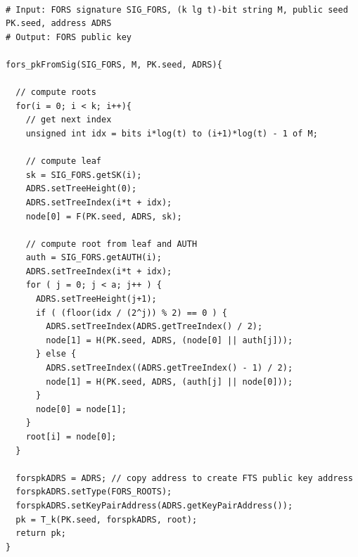 \begin{lstlisting}[breaklines=true, label=alg:fors:rootFromSig, language=pseudoc,
                   caption=\forspkfromsig\ --
                   Compute a \fors public key from a \fors signature.]

# Input: FORS signature SIG_FORS, (k lg t)-bit string M, public seed PK.seed, address ADRS
# Output: FORS public key

fors_pkFromSig(SIG_FORS, M, PK.seed, ADRS){

  // compute roots
  for(i = 0; i < k; i++){
    // get next index
    unsigned int idx = bits i*log(t) to (i+1)*log(t) - 1 of M;

    // compute leaf
    sk = SIG_FORS.getSK(i);
    ADRS.setTreeHeight(0);
    ADRS.setTreeIndex(i*t + idx);
    node[0] = F(PK.seed, ADRS, sk);

    // compute root from leaf and AUTH
    auth = SIG_FORS.getAUTH(i);
    ADRS.setTreeIndex(i*t + idx);
    for ( j = 0; j < a; j++ ) {
      ADRS.setTreeHeight(j+1);
      if ( (floor(idx / (2^j)) % 2) == 0 ) {
        ADRS.setTreeIndex(ADRS.getTreeIndex() / 2);
        node[1] = H(PK.seed, ADRS, (node[0] || auth[j]));
      } else {
        ADRS.setTreeIndex((ADRS.getTreeIndex() - 1) / 2);
        node[1] = H(PK.seed, ADRS, (auth[j] || node[0]));
      }
      node[0] = node[1];
    }
    root[i] = node[0];
  }

  forspkADRS = ADRS; // copy address to create FTS public key address
  forspkADRS.setType(FORS_ROOTS);
  forspkADRS.setKeyPairAddress(ADRS.getKeyPairAddress());
  pk = T_k(PK.seed, forspkADRS, root);
  return pk;
}
\end{lstlisting}

